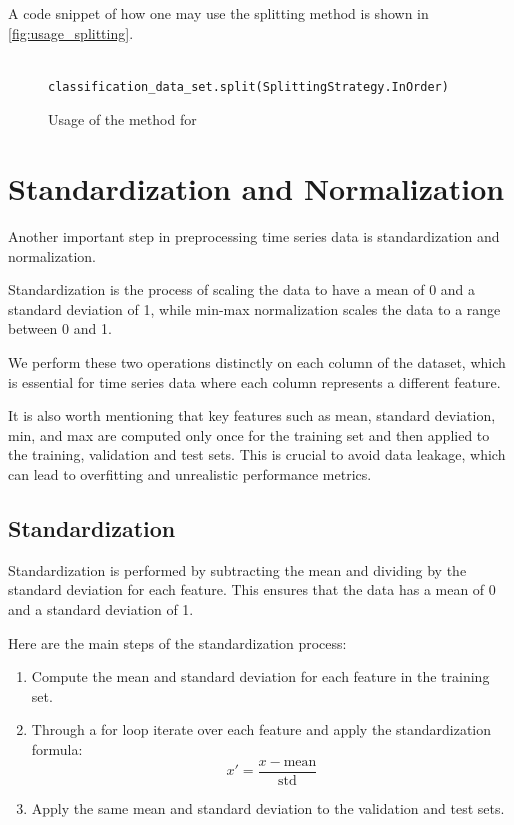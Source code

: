 \documentclass[review]{AIM_report}
\begin{document}
A code snippet of how one may use the splitting method is shown in \autoref{fig:usage_splitting}.

\begin{figure}[H]
    \begin{lstlisting}[style=python]

classification_data_set.split(SplittingStrategy.InOrder)
    \end{lstlisting}
    \caption{Usage of the \splitShort method for \classificationDataSet}
    \label{fig:usage_splitting}
\end{figure}

\newpage
\section{Standardization and Normalization}
\label{sec:standardization-and-normalization}

Another important step in preprocessing time series data is standardization and normalization.

Standardization is the process of scaling the data to have a mean of 0 and a standard deviation of 1, while min-max normalization scales the data to a range between 0 and 1.

We perform these two operations distinctly on each column of the dataset, which is essential for time series data where each column represents a different feature.

It is also worth mentioning that key features such as mean, standard deviation, min, and max are computed only once for the training set and then applied to the training, validation and test sets. This is crucial to avoid data leakage, which can lead to overfitting and unrealistic performance metrics.

\subsection{Standardization}

Standardization is performed by subtracting the mean and dividing by the standard deviation for each feature. This ensures that the data has a mean of 0 and a standard deviation of 1.

Here are the main steps of the standardization process:
\begin{enumerate}
    \item Compute the mean and standard deviation for each feature in the training set.
    \item Through a for loop iterate over each feature and apply the standardization formula:
          \begin{equation}
              x' = \frac{x - \text{mean}}{\text{std}}
          \end{equation}
    \item Apply the same mean and standard deviation to the validation and test sets.
\end{enumerate}
\end{document}
